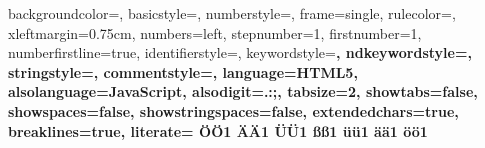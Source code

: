  {%
  backgroundcolor=\color{xlightgray},
  basicstyle={\footnotesize\ttfamily},   
  numberstyle=\tiny\color{darkgray},
  frame=single,
  rulecolor=\color{lightgray},
  xleftmargin={0.75cm},
  numbers=left,
  stepnumber=1,
  firstnumber=1,
  numberfirstline=true,	
  identifierstyle=\color{xdarkgray},
  keywordstyle=\color{lila}\bfseries,
  ndkeywordstyle=\color{editorGreen}\bfseries,
  stringstyle=\color{mycyan}\ttfamily,
  commentstyle=\color{mygreen}\ttfamily,
%
  language=HTML5,
  alsolanguage=JavaScript,
  alsodigit={.:;},	
  tabsize=2,
  showtabs=false,
  showspaces=false,
  showstringspaces=false,
  extendedchars=true,
  breaklines=true,
  literate=%
  {Ö}{{\"O}}1
  {Ä}{{\"A}}1
  {Ü}{{\"U}}1
  {ß}{{\ss}}1
  {ü}{{\"u}}1
  {ä}{{\"a}}1
  {ö}{{\"o}}1
}

%

